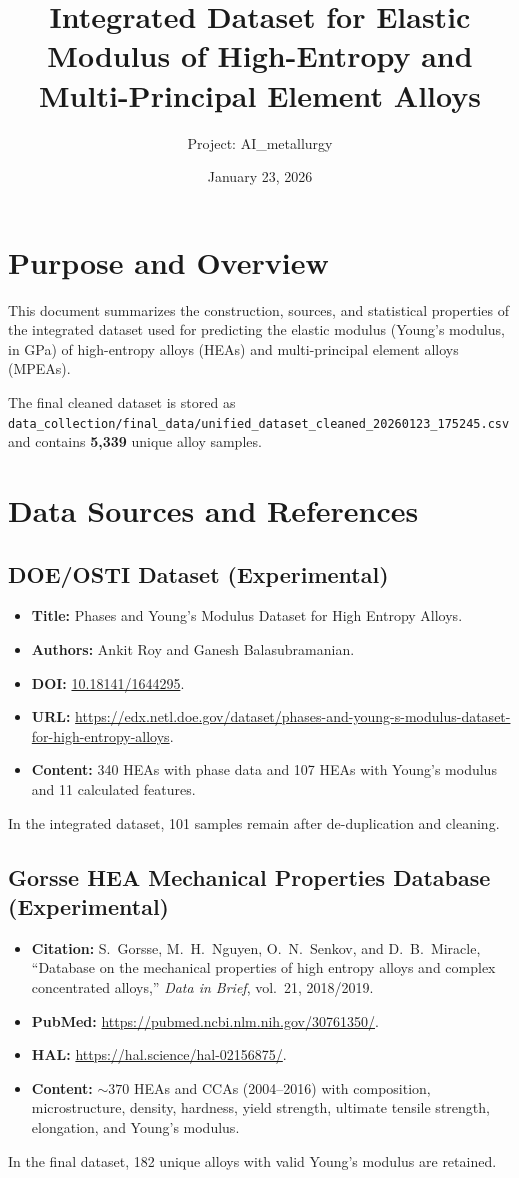 \documentclass[12pt]{article}
\title{Integrated Dataset for Elastic Modulus of High-Entropy and Multi-Principal Element Alloys}
\author{Project: AI\_metallurgy}
\date{January 23, 2026}
\begin{document}
\maketitle

\section{Purpose and Overview}
This document summarizes the construction, sources, and statistical properties of the integrated dataset used for predicting the elastic modulus (Young's modulus, in GPa) of high-entropy alloys (HEAs) and multi-principal element alloys (MPEAs).

The final cleaned dataset is stored as
\texttt{data\_collection/final\_data/unified\_dataset\_cleaned\_20260123\_175245.csv} and contains
\textbf{5,339} unique alloy samples.

\section{Data Sources and References}
\subsection{DOE/OSTI Dataset (Experimental)}
\begin{itemize}
  \item \textbf{Title:} Phases and Young's Modulus Dataset for High Entropy Alloys.
  \item \textbf{Authors:} Ankit Roy and Ganesh Balasubramanian.
  \item \textbf{DOI:} \href{https://doi.org/10.18141/1644295}{10.18141/1644295}.
  \item \textbf{URL:} \url{https://edx.netl.doe.gov/dataset/phases-and-young-s-modulus-dataset-for-high-entropy-alloys}.
  \item \textbf{Content:} 340 HEAs with phase data and 107 HEAs with Young's modulus and 11 calculated features.
\end{itemize}
In the integrated dataset, 101 samples remain after de-duplication and cleaning.

\subsection{Gorsse HEA Mechanical Properties Database (Experimental)}
\begin{itemize}
  \item \textbf{Citation:} S.~Gorsse, M.~H.~Nguyen, O.~N.~Senkov, and D.~B.~Miracle, ``Database on the mechanical properties of high entropy alloys and complex concentrated alloys,'' \emph{Data in Brief}, vol.~21, 2018/2019.
  \item \textbf{PubMed:} \url{https://pubmed.ncbi.nlm.nih.gov/30761350/}.
  \item \textbf{HAL:} \url{https://hal.science/hal-02156875/}.
  \item \textbf{Content:} $\sim 370$ HEAs and CCAs (2004--2016) with composition, microstructure, density, hardness, yield strength, ultimate tensile strength, elongation, and Young's modulus.
\end{itemize}
In the final dataset, 182 unique alloys with valid Young's modulus are retained.
\end{document}
